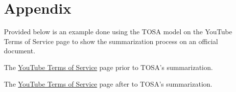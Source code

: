 \documentclass[sigconf, nonacm]{acmart}
\begin{document}
\onecolumn




\section*{Appendix}
Provided below is an example done using the TOSA model on the YouTube Terms of Service page to show the summarization process on an official document.

The {\color{blue}\href{https://github.com/itsJohnny21/TOSA/blob/main/resources/simplified_tos/YouTube%20TOS.pdf}{YouTube Terms of Service}} page prior to TOSA's summarization.

The {\color{blue}\href{https://github.com/itsJohnny21/TOSA/blob/main/resources/simplified_tos/Simplified%20YouTube%20TOS.pdf}{YouTube Terms of Service}} page after to TOSA's summarization.
\end{document}
